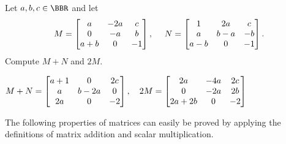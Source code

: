 \begin{exer}
Let $a,b,c\in\BBR$ and let 
$$M = \begin{bmatrix}a & -2a & c \cr  0 & -a & b \cr a + b & 0 &
-1 \cr\end{bmatrix},\ \ \ \ N = \begin{bmatrix}1 & 2a & c \cr  a & b
- a & -b \cr a - b & 0 & -1 \cr \end{bmatrix}.$$
Compute $M+N$ and $2M$.
\vspace*{2.5in}
\begin{answer}
$M + N = \begin{bmatrix}a + 1 & 0 & 2c \cr  a &  b - 2a & 0 \cr 2a
& 0 & -2 \cr\end{bmatrix}, \ \ \ 2M = \begin{bmatrix}2a & -4a & 2c
\cr 0 & -2a & 2b \cr 2a + 2b & 0 & -2 \cr\end{bmatrix}$
\end{answer}
\end{exer}


The following properties of matrices can easily be proved by 
applying the definitions of matrix addition and scalar multiplication.

